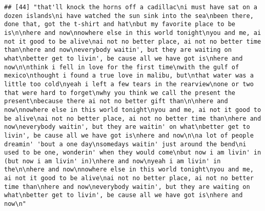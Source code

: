 \documentclass[]{article}
\begin{document}
\begin{verbatim}
## [44] "that'll knock the horns off a cadillac\ni must have sat on a dozen islands\ni have watched the sun sink into the sea\nbeen there, done that, got the t-shirt and hat\nbut my favorite place to be is\n\nhere and now\nnowhere else in this world tonight\nyou and me, ai not it good to be alive\nai not no better place, ai not no better time than\nhere and now\neverybody waitin', but they are waiting on what\nbetter get to livin', be cause all we have got is\nhere and now\n\nthink i fell in love for the first time\nwith the gulf of mexico\nthought i found a true love in malibu, but\nthat water was a little too cold\nyeah i left a few tears in the rearview\none or two that were hard to forget\nwhy you think we call the present the present\nbecause there ai not no better gift than\n\nhere and now\nnowhere else in this world tonight\nyou and me, ai not it good to be alive\nai not no better place, ai not no better time than\nhere and now\neverybody waitin', but they are waitin' on what\nbetter get to livin', be cause all we have got is\nhere and now\n\na lot of people dreamin' 'bout a one day\nsomedays waitin' just around the bend\ni used to be one, wonderin' when they would come\nbut now i am livin' in (but now i am livin' in)\nhere and now\nyeah i am livin' in the\n\nhere and now\nnowhere else in this world tonight\nyou and me, ai not it good to be alive\nai not no better place, ai not no better time than\nhere and now\neverybody waitin', but they are waiting on what\nbetter get to livin', be cause all we have got is\nhere and now\n"                                                                                                                                                                                                                                                                                                                                                                                                                                                                                                                                                                                                                                                                                                                                                                                                                                                                                                                                                                                                                                                                                                                                                                                                                                                                                                                                                                     

\end{verbatim}
\end{document}

